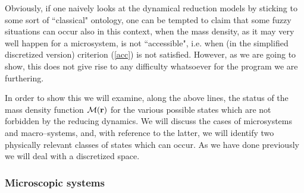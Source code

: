 \documentclass[12pt]{article}
\begin{document}
Obviously, if one naively looks at the dynamical reduction models
by sticking to some sort of ``classical" ontology, one can be
tempted to claim that some fuzzy situations can occur also in this
context, when the mass density, as it may very well happen for a
microsystem, is not ``accessible", i.e. when (in the simplified
discretized version) criterion (\ref{acc}) is not satisfied.
However, as we are going to show, this does not give rise to any
difficulty whatsoever for the program we are furthering.

In order to show this we will examine, along the above lines, the
status of the mass density function ${\mathcal M}({\bf r})$ for
the various possible states which are not forbidden by the
reducing dynamics. We will discuss the cases of microsystems and
macro--systems, and, with reference to the latter, we will
identify two physically relevant classes of states which can
occur. As we have done previously we will deal with a discretized
space.

\subsubsection{Microscopic systems} \label{sec1231}
\end{document}
